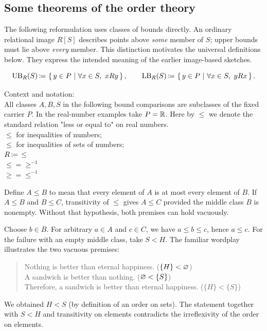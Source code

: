\subsection{Some theorems of the order theory}

The following reformulation uses classes of bounds directly. An ordinary
relational image $R[S]$ describes points above \emph{some} member of $S$;
upper bounds must lie above \emph{every} member. This distinction motivates
the universal definitions below. They express the intended meaning of the
earlier image-based sketches.
\begin{definition}
\[
\UB_R(S)\ceq\cc{y\in P}{\forall x\in S,\ xRy},\qquad
\LB_R(S)\ceq\cc{y\in P}{\forall x\in S,\ yRx}.
\]
\end{definition}

Context and notation:\\
All classes $A,B,S$ in the following bound comparisons are subclasses of
the fixed carrier $P$. In the real-number examples take $P=\mathbb{R}$.
Here by $\leq$ we denote the standard relation "less or equal to" on real numbers.\\
$\leq$ for inequalities of numbers;\\
$\leqslant$ for inequalities of sets of numbers;\\
$R \,{\coloneqq}\, \leq$\\
$\leq = \geq^{-1}$\\
$\geq = \leq^{-1}$

\begin{remark}
Define $A\leqslant B$ to mean that every element of $A$ is at most every element of $B$. If $A\leqslant B$ and $B\leqslant C$, transitivity of $\leq$ gives $A\leqslant C$ provided the middle class $B$ is nonempty. Without that hypothesis, both premises can hold vacuously.
\end{remark}
\Proof
Choose $b\in B$. For arbitrary $a\in A$ and $c\in C$, we have $a\leq b\leq c$, hence $a\leq c$. For the failure with an empty middle class, take $S<H$. The familiar wordplay illustrates the two vacuous premises:
\begin{quote}
Nothing is better than eternal happiness. \null\hfill ($\{H\}<\varnothing$)\\
A sandwich is better than nothing. \null\hfill ($\varnothing<\{S\}$)\\
Therefore, a sandwich is better than eternal happiness. \null\hfill ($\{H\}<\{S\}$)
\end{quote}
We obtained $H<S$ (by definition of an order on sets). The statement together with $S<H$ and transitivity on elements contradicts the irreflexivity of the order on elements.\\
\Done
\noindent

